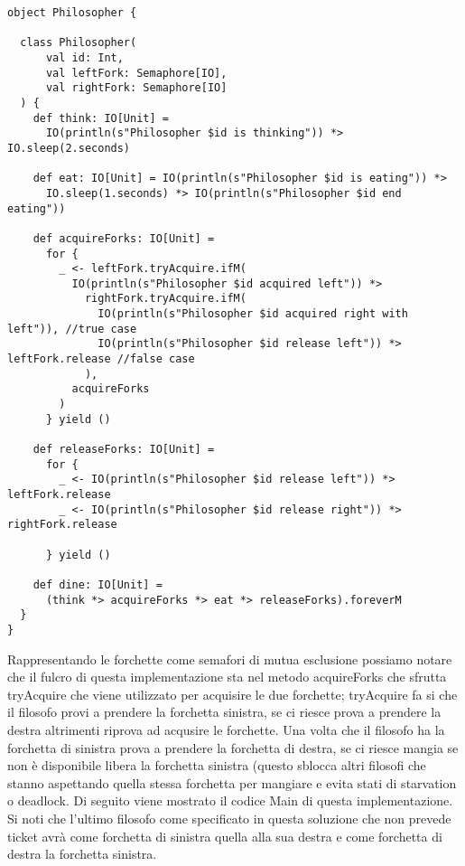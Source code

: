 \begin{verbatim}
object Philosopher {

  class Philosopher(
      val id: Int,
      val leftFork: Semaphore[IO],
      val rightFork: Semaphore[IO]
  ) {
    def think: IO[Unit] =
      IO(println(s"Philosopher $id is thinking")) *> IO.sleep(2.seconds)

    def eat: IO[Unit] = IO(println(s"Philosopher $id is eating")) *>
      IO.sleep(1.seconds) *> IO(println(s"Philosopher $id end eating"))

    def acquireForks: IO[Unit] =
      for {
        _ <- leftFork.tryAcquire.ifM(
          IO(println(s"Philosopher $id acquired left")) *>
            rightFork.tryAcquire.ifM(
              IO(println(s"Philosopher $id acquired right with left")), //true case
              IO(println(s"Philosopher $id release left")) *> leftFork.release //false case
            ),
          acquireForks
        )
      } yield ()

    def releaseForks: IO[Unit] =
      for {
        _ <- IO(println(s"Philosopher $id release left")) *> leftFork.release
        _ <- IO(println(s"Philosopher $id release right")) *> rightFork.release

      } yield ()

    def dine: IO[Unit] =
      (think *> acquireForks *> eat *> releaseForks).foreverM
  }
}
\end{verbatim}

\noindent Rappresentando le forchette come semafori di mutua esclusione possiamo notare che il fulcro di questa implementazione sta nel metodo acquireForks che sfrutta tryAcquire che viene utilizzato per acquisire le due forchette; tryAcquire fa si che il filosofo provi a prendere la forchetta sinistra, se ci riesce prova a prendere la destra altrimenti riprova ad acqusire le forchette. Una volta che il filosofo ha la forchetta di sinistra prova a prendere la forchetta di destra, se ci riesce mangia se non è disponibile libera la forchetta sinistra (questo sblocca altri filosofi che stanno aspettando quella stessa forchetta per mangiare e evita stati di starvation o deadlock. Di seguito viene mostrato il codice Main di questa implementazione. Si noti che l'ultimo filosofo come specificato in questa soluzione che non prevede ticket avrà come forchetta di sinistra quella alla sua destra e come forchetta di destra la forchetta sinistra. 

